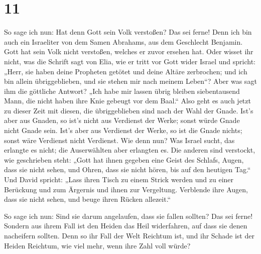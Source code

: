 \hypertarget{section-10}{%
\section{11}\label{section-10}}

 So sage ich nun: Hat denn Gott sein Volk verstoßen? Das
sei ferne! Denn ich bin auch ein Israeliter von dem Samen Abrahams, aus
dem Geschlecht Benjamin.  Gott hat sein Volk nicht
verstoßen, welches er zuvor ersehen hat. Oder wisset ihr nicht, was die
Schrift sagt von Elia, wie er tritt vor Gott wider Israel und spricht:
 „Herr, sie haben deine Propheten getötet und deine Altäre
zerbrochen; und ich bin allein übriggeblieben, und sie stehen mir nach
meinem Leben``?  Aber was sagt ihm die göttliche Antwort?
„Ich habe mir lassen übrig bleiben siebentausend Mann, die nicht haben
ihre Knie gebeugt vor dem Baal.``  Also geht es auch jetzt
zu dieser Zeit mit diesen, die übriggeblieben sind nach der Wahl der
Gnade.  Ist's aber aus Gnaden, so ist's nicht aus
Verdienst der Werke; sonst würde Gnade nicht Gnade sein. Ist's aber aus
Verdienst der Werke, so ist die Gnade nichts; sonst wäre Verdienst nicht
Verdienst.  Wie denn nun? Was Israel sucht, das erlangte
es nicht; die Auserwählten aber erlangten es. Die anderen sind
verstockt,  wie geschrieben steht: „Gott hat ihnen gegeben
eine Geist des Schlafs, Augen, dass sie nicht sehen, und Ohren, dass sie
nicht hören, bis auf den heutigen Tag.``  Und David
spricht: „Lass ihren Tisch zu einem Strick werden und zu einer Berückung
und zum Ärgernis und ihnen zur Vergeltung.  Verblende
ihre Augen, dass sie nicht sehen, und beuge ihren Rücken allezeit.``

 So sage ich nun: Sind sie darum angelaufen, dass sie
fallen sollten? Das sei ferne! Sondern aus ihrem Fall ist den Heiden das
Heil widerfahren, auf dass sie denen nacheifern sollten. 
Denn so ihr Fall der Welt Reichtum ist, und ihr Schade ist der Heiden
Reichtum, wie viel mehr, wenn ihre Zahl voll würde?

